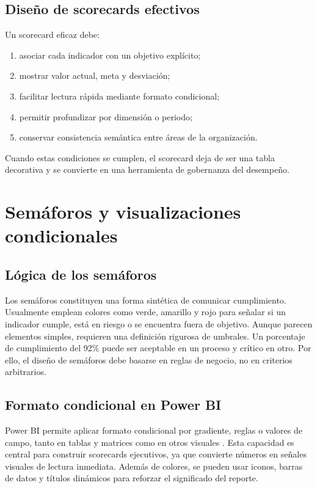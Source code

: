 \documentclass[12pt]{article}
\begin{document}
\subsection{Diseño de scorecards efectivos}
Un scorecard eficaz debe:
\begin{enumerate}[label=\textbf{S\arabic*.}, leftmargin=*]
\item asociar cada indicador con un objetivo explícito;
\item mostrar valor actual, meta y desviación;
\item facilitar lectura rápida mediante formato condicional;
\item permitir profundizar por dimensión o periodo;
\item conservar consistencia semántica entre áreas de la organización.
\end{enumerate}

Cuando estas condiciones se cumplen, el scorecard deja de ser una tabla decorativa y se convierte en una herramienta de gobernanza del desempeño.

\section{Semáforos y visualizaciones condicionales}
\subsection{Lógica de los semáforos}
Los semáforos constituyen una forma sintética de comunicar cumplimiento. Usualmente emplean colores como verde, amarillo y rojo para señalar si un indicador cumple, está en riesgo o se encuentra fuera de objetivo. Aunque parecen elementos simples, requieren una definición rigurosa de umbrales. Un porcentaje de cumplimiento del 92\% puede ser aceptable en un proceso y crítico en otro. Por ello, el diseño de semáforos debe basarse en reglas de negocio, no en criterios arbitrarios.

\subsection{Formato condicional en Power BI}
Power BI permite aplicar formato condicional por gradiente, reglas o valores de campo, tanto en tablas y matrices como en otros visuales \cite{ms_conditional_formatting}. Esta capacidad es central para construir scorecards ejecutivos, ya que convierte números en señales visuales de lectura inmediata. Además de colores, se pueden usar iconos, barras de datos y títulos dinámicos para reforzar el significado del reporte.
\end{document}
